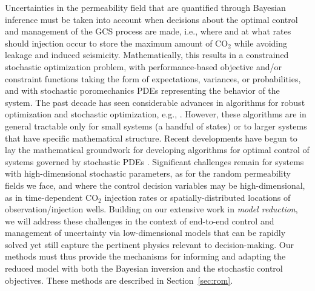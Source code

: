 \documentclass[11pt,final]{article}%
\def\CO2{CO$_2$}
\begin{document}
Uncertainties in the permeability field that are quantified through Bayesian inference must be taken into account when decisions about the optimal control and management of the GCS process are made, i.e., where and at what rates should injection occur to store the maximum amount of \CO2 while avoiding leakage and induced seismicity. 
Mathematically, this results in a  constrained stochastic optimization problem, 
with performance-based objective and/or constraint functions taking the form of expectations, variances, or probabilities, and with stochastic poromechanics PDEs representing the behavior of the system. The past decade has seen considerable advances in algorithms for robust optimization and stochastic optimization, e.g., \cite{bertsimas2004price, ben2006extending,birge1997introduction,shapiro2009lectures}. However, these algorithms are in general tractable only for small systems (a handful of states) or to larger systems that have specific mathematical structure.
Recent developments have begun to lay the mathematical groundwork for developing algorithms for optimal control of systems governed by stochastic PDEs \cite{GunzburgerLeeLee11,GunzburgerMing11,Kouri12}. Significant challenges remain for systems with high-dimensional stochastic parameters, as for the random permeability fields we face, and where the control decision variables may be high-dimensional, as in time-dependent \CO2 injection rates or spatially-distributed locations of observation/injection wells.
%
Building on our extensive work in {\em model reduction}, we will address these challenges in the context of end-to-end control and management of uncertainty via low-dimensional models that can be rapidly solved yet still capture the pertinent physics relevant to decision-making. Our methods must thus provide the mechanisms for informing and adapting the reduced model with both the Bayesian inversion and the stochastic control objectives. These methods are described in Section~\ref{sec:rom}.
\end{document}
